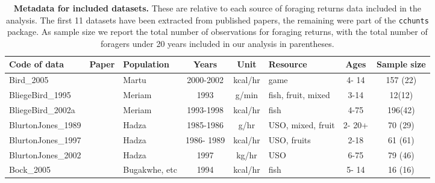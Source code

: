 \begin{landscape}
\begin{longtable}{M{2.6cm} M{3.6cm} M{1.5cm} c c M{1cm} c c}
\caption{\textbf{Metadata for included datasets.} These are relative to each source of foraging returns data included in the analysis. The first 11 datasets have been extracted from published papers, the remaining were part of the \texttt{cchunts} package. As sample size we report the total number of observations for foraging returns, with the total number of foragers under 20 years included in our analysis in parentheses. }\\
\hline
{} 
Code of data                  & Paper                                     & Population      & Years      & Unit      & Resource           & Ages    & Sample size \\ \hline
\endfirsthead
%
\endhead
%
Bird\_2005                     & \cite{bird_mardu_2005}                    & Martu           & 2000-2002  & kcal/hr   & game               & 4- 14   & 157 (22)    \\
BliegeBird\_1995               & \cite{bird_children_1995}                 & Meriam          & 1993       & g/min     & fish, fruit, mixed & 3-14    & 12(12)      \\
BliegeBird\_2002a              & \cite{bird_constraints_2002}              & Meriam          & 1993-1998  & kcal/hr   & fish               & 4-75    & 196(42)     \\
BlurtonJones\_1989             & \cite{blurton_jones_modelling_1989}       & Hadza           & 1985-1986  & g/hr      & USO, mixed, fruit  & 2- 20+  & 70 (29)     \\
BlurtonJones\_1997             & \cite{blurton_jones_why_1997}             & Hadza           & 1986- 1989 & kcal/hr   & USO, fruits        & 2-18    & 61 (61)     \\
BlurtonJones\_2002             & \cite{blurton_jones_selection_2002}       & Hadza           & 1997       & kg/hr     & USO                & 6-75    & 79 (46)     \\
Bock\_2005                     & \cite{bock_what_2005}                     & Bugakwhe, etc & 1994       & kcal/hr   & fish               & 5- 14   & 16 (16)     \\

\end{longtable}
\end{landscape}
